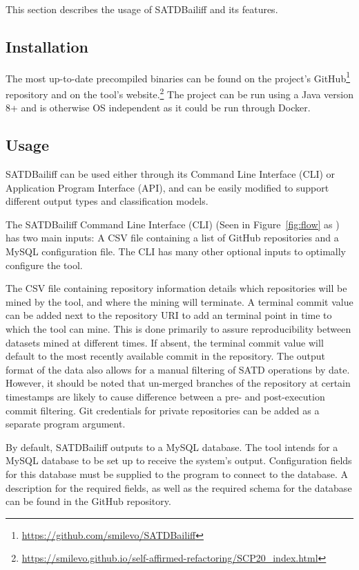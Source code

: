 \documentclass[3p]{elsarticle}
\newcommand{\approach}{SATDBailiff\xspace}
\newcommand{\ali}[1]{\textcolor{red}{{\it [Ali: #1]}}}
\newcommand*\circled[1]{\tikz[baseline=(char.base)]{
            \node[shape=circle,draw,inner sep=2pt] (char) {#1};}}
\begin{document}
This section describes the usage of \approach and its features.
\subsection{Installation}
The most up-to-date precompiled binaries can be found on the project's GitHub\footnote{\url{https://github.com/smilevo/SATDBailiff}} repository and on the tool's website.\footnote{\url{https://smilevo.github.io/self-affirmed-refactoring/SCP20_index.html}} The project can be run using a Java version 8+ and is otherwise OS independent as it could be run through Docker. %
\subsection{Usage}
\approach can be used either through its Command Line Interface (CLI) or Application Program Interface (API), and can be easily modified to support different output types and classification models.

The \approach Command Line Interface (CLI) (Seen in Figure~\ref{fig:flow} as \circled{1}) has two main inputs: A CSV file containing a list of GitHub repositories and a MySQL configuration file. The CLI has many other optional inputs to optimally configure the tool.

The CSV file containing repository information details which repositories will be mined by the tool, and where the mining will terminate. A terminal commit value can be added next to the repository URI to add an terminal point in time to which the tool can mine. This is done primarily to assure reproducibility between datasets mined at different times. If absent, the terminal commit value will default to the most recently available commit in the repository. The output format of the data also allows for a manual filtering of SATD operations by date. However, it should be noted that un-merged branches of the repository at certain timestamps are likely to cause difference between a pre- and post-execution commit filtering. Git credentials for private repositories can be added as a separate program argument.

By default, \approach outputs to a MySQL database. The tool intends for a MySQL database to be set up to receive the system's output. Configuration fields for this database must be supplied to the program to connect to the database. A description for the required fields, as well as the required schema for the database can be found in the GitHub repository.
\end{document}
